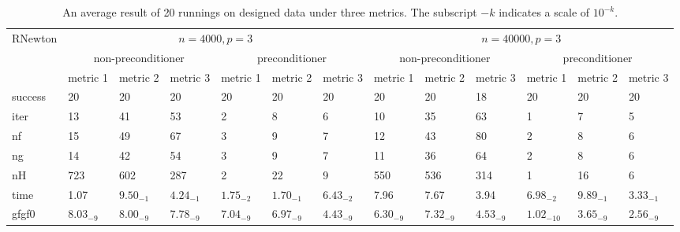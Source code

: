 \documentclass[11pt]{article}
\numberwithin{equation}{section}
\begin{document}
\begin{table}[htbp]
\caption{An average result of 20 runnings on designed data under three metrics. The subscript $-k$ indicates a scale of $10^{-k}$.}	
\centering
\setlength{\tabcolsep}{1.7pt}
{\scriptsize
\begin{tabular}{l|l|l|l|l|l|l|l|l|l|l|l|l} \hline \multicolumn{1}{l|}{\multirow{3}{*}{RNewton}} & \multicolumn{6}{c|}{$n=4000, p=3$}                                                                                                                                                             & \multicolumn{6}{c}{$n=40000,p=3$}                                                                                                                                                              \\ \cline{2-13} 
\multicolumn{1}{l|}{}                        & \multicolumn{3}{c|}{non-preconditioner}                                                       & \multicolumn{3}{c|}{preconditioner}                                                           & \multicolumn{3}{c|}{non-preconditioner}                                                       & \multicolumn{3}{c}{preconditioner}                                                            \\ \cline{2-13} 
\multicolumn{1}{l|}{}                        & \multicolumn{1}{l|}{metric 1} & \multicolumn{1}{l|}{metric 2} & \multicolumn{1}{l|}{metric 3} & \multicolumn{1}{l|}{metric 1} & \multicolumn{1}{l|}{metric 2} & \multicolumn{1}{l|}{metric 3} & \multicolumn{1}{l|}{metric 1} & \multicolumn{1}{l|}{metric 2} & \multicolumn{1}{l|}{metric 3} & \multicolumn{1}{l|}{metric 1} & \multicolumn{1}{l|}{metric 2} & \multicolumn{1}{l}{metric 3} \\ \hline
  success &      20 &      20 &      20 &      20 &      20 &      20 &      20 &      20 &      18 &      20 &      20 &      20 \\ 
    iter &      13 &      41 &      53 &       2 &       8 &       6 &      10 &      35 &      63 &       1 &       7 &       5 \\ 
      nf &      15 &      49 &      67 &       3 &       9 &       7 &      12 &      43 &      80 &       2 &       8 &       6 \\ 
      ng &      14 &      42 &      54 &       3 &       9 &       7 &      11 &      36 &      64 &       2 &       8 &       6 \\ 
      nH &     723 &     602 &     287 &       2 &      22 &       9 &     550 &     536 &     314 &       1 &      16 &       6 \\ 
    time & 1.07 & $9.50_{-1}$ & $4.24_{-1}$ & $1.75_{-2}$ & $1.70_{-1}$ & $6.43_{-2}$ & 7.96 & 7.67 & 3.94 & $6.98_{-2}$ & $9.89_{-1}$ & $3.33_{-1}$ \\ 
   gfgf0 & $8.03_{-9}$ & $8.00_{-9}$ & $7.78_{-9}$ & $7.04_{-9}$ & $6.97_{-9}$ & $4.43_{-9}$ & $6.30_{-9}$ & $7.32_{-9}$ & $4.53_{-9}$ & $1.02_{-10}$ & $3.65_{-9}$ & $2.56_{-9}$ \\ 
 \hline
\end{tabular}
} 
\label{NumExp-table2}
\end{table}
\end{document}
